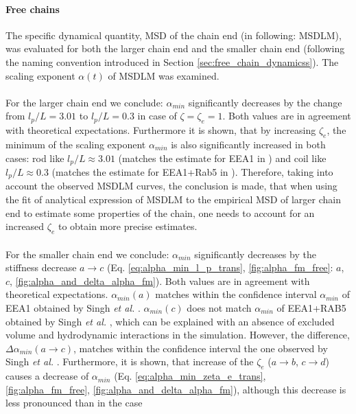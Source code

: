 \documentclass[
    paper=A4,pagesize=automedia,fontsize=12pt,
    BCOR=15mm,DIV=22,
    twoside,headinclude,footinclude=false,
    fleqn,             %
    bibliography=totocnumbered,          %
    listof=totoc,                %
    listof=flat,                 %
    cleardoublepage=empty      %
    numbers=endperiod
]{scrartcl}
\begin{document}
\paragraph{Free chains}
The specific dynamical quantity, MSD of the chain end (in following: MSDLM), was evaluated for both 
the larger chain end and the smaller chain end (following the naming convention introduced 
in Section \ref{sec:free_chain_dynamicss}). 
The scaling exponent $\alpha(t)$ of MSDLM was examined.
\\
\\
For the larger chain end we conclude: $\alpha_{min}$ 
significantly decreases by the change from $l_p/L=3.01$ to $l_p/L=0.3$ 
in case of $\zeta=\zeta_e=1$. Both values are in agreement 
with theoretical expectations.
Furthermore it is shown, that
by increasing $\zeta_e$, the minimum of the scaling exponent $\alpha_{min}$ is also 
significantly increased in both cases: rod like $l_p/L \approx 3.01$ (matches the 
estimate for EEA1 in \cite{Singh:2022}) and
coil like  $l_p/L \approx 0.3$ (matches the estimate for EEA1+Rab5 in \cite{Singh:2022}).
Therefore, taking into account the observed MSDLM curves, the conclusion is made,
that when using the fit of analytical expression of MSDLM to the empirical MSD of
larger chain end to estimate some properties of the chain, one needs to account
for an increased $\zeta_e$ to obtain more precise estimates.
\\
\\
For the smaller chain end we conclude: $\alpha_{min}$ significantly
decreases by the stiffness decrease $a \rightarrow c$ 
(Eq. \ref{eq:alpha_min_l_p_trans}, \autoref{fig:alpha_fm_free}: $a$, $c$, 
\autoref{fig:alpha_and_delta_alpha_fm}). 
Both values are in agreement with theoretical expectations.
$\alpha_{min}(a)$ matches within the confidence interval
$\alpha_{min}$ of EEA1 obtained by Singh \emph{et al.} \cite{Singh:2022}.
$\alpha_{min}(c)$ does not match $\alpha_{min}$ of EEA1+RAB5 obtained 
by Singh \emph{et al.} \cite{Singh:2022}, which
can be explained with an absence of excluded volume and hydrodynamic interactions in the
simulation. However, the difference,
$\Delta \alpha_{min}(a \rightarrow c)$, matches
within the confidence interval the one observed by Singh \emph{et al.} \cite{Singh:2022}.
Furthermore, it is shown, that increase of the $\zeta_e$ ($a \rightarrow b$, $c \rightarrow d$) 
causes a decrease of $\alpha_{min}$ (Eq. \ref{eq:alpha_min_zeta_e_trans}, 
\autoref{fig:alpha_fm_free}, \autoref{fig:alpha_and_delta_alpha_fm}),
although this decrease is less pronounced than in the case 
\end{document}

